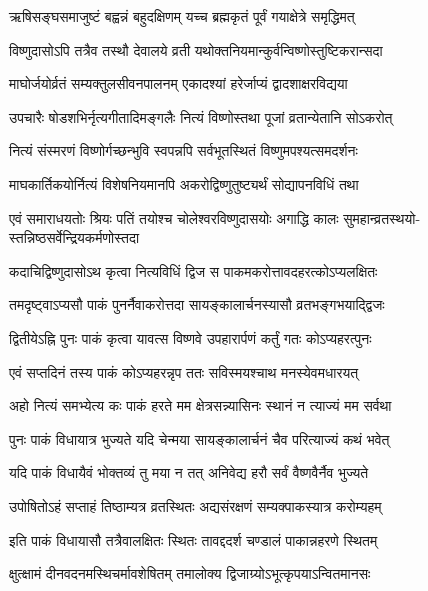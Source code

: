 \twolineshloka
{ऋषिसङ्घसमाजुष्टं बह्वन्नं बहुदक्षिणम्}
{यच्च ब्रह्मकृतं पूर्वं गयाक्षेत्रे समृद्धिमत्} %

\twolineshloka
{विष्णुदासोऽपि तत्रैव तस्थौ देवालये व्रती}
{यथोक्तनियमान्कुर्वन्विष्णोस्तुष्टिकरान्सदा} %

\twolineshloka
{माघोर्जयोर्व्रतं सम्यक्तुलसीवनपालनम्}
{एकादश्यां हरेर्जाप्यं द्वादशाक्षरविद्यया} %

\twolineshloka
{उपचारैः षोडशभिर्नृत्यगीतादिमङ्गलैः}
{नित्यं विष्णोस्तथा पूजां व्रतान्येतानि सोऽकरोत्} %

\twolineshloka
{नित्यं संस्मरणं विष्णोर्गच्छन्भुवि स्वपन्नपि}
{सर्वभूतस्थितं विष्णुमपश्यत्समदर्शनः} %

\twolineshloka
{माघकार्तिकयोर्नित्यं विशेषनियमानपि}
{अकरोद्विष्णुतुष्ट्यर्थं सोद्यापनविधिं तथा} %

\fourlineindentedshloka
{एवं समाराधयतोः श्रियः पतिं}
{तयोश्च चोलेश्वरविष्णुदासयोः}
{अगाद्धि कालः सुमहान्व्रतस्थयो-}
{स्तन्निष्ठसर्वेन्द्रियकर्मणोस्तदा} %





\twolineshloka
{कदाचिद्विष्णुदासोऽथ कृत्वा नित्यविधिं द्विज}
{स पाकमकरोत्तावदहरत्कोऽप्यलक्षितः} %

\twolineshloka
{तमदृष्ट्वाऽप्यसौ पाकं पुनर्नैवाकरोत्तदा}
{सायङ्कालार्चनस्यासौ व्रतभङ्गभयाद्द्विजः} %

\twolineshloka
{द्वितीयेऽह्नि पुनः पाकं कृत्वा यावत्स विष्णवे}
{उपहारार्पणं कर्तुं गतः कोऽप्यहरत्पुनः} %

\twolineshloka
{एवं सप्तदिनं तस्य पाकं कोऽप्यहरन्नृप}
{ततः सविस्मयश्चाथ मनस्येवमधारयत्} %

\twolineshloka
{अहो नित्यं समभ्येत्य कः पाकं हरते मम}
{क्षेत्रसन्न्यासिनः स्थानं न त्याज्यं मम सर्वथा} %

\twolineshloka
{पुनः पाकं विधायात्र भुज्यते यदि चेन्मया}
{सायङ्कालार्चनं चैव परित्याज्यं कथं भवेत्} %

\twolineshloka
{यदि पाकं विधायैवं भोक्तव्यं तु मया न तत्}
{अनिवेद्य हरौ सर्वं वैष्णवैर्नैव भुज्यते} %

\twolineshloka
{उपोषितोऽहं सप्ताहं तिष्ठाम्यत्र व्रतस्थितः}
{अद्यसंरक्षणं सम्यक्पाकस्यात्र करोम्यहम्} %

\twolineshloka
{इति पाकं विधायासौ तत्रैवालक्षितः स्थितः}
{तावद्ददर्श चण्डालं पाकान्नहरणे स्थितम्} %

\twolineshloka
{क्षुत्क्षामं दीनवदनमस्थिचर्मावशेषितम्}
{तमालोक्य द्विजाग्र्योऽभूत्कृपयाऽन्वितमानसः} %

